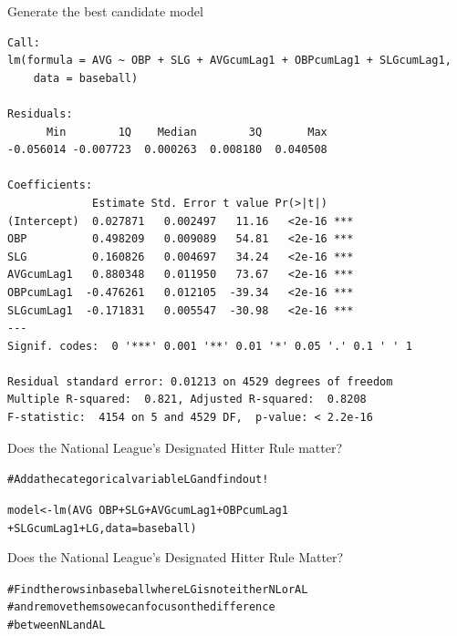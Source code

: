 \documentclass{beamer}\usepackage[]{graphicx}\usepackage[]{color}
\makeatletter
\newcommand{\hlcom}[1]{\textcolor[rgb]{0.824,0.706,0.549}{#1}}%
\newcommand{\hlopt}[1]{\textcolor[rgb]{1,0.894,0.769}{#1}}%
\newcommand{\hlstd}[1]{\textcolor[rgb]{1,0.894,0.769}{#1}}%
\newcommand{\hlkwb}[1]{\textcolor[rgb]{0.804,0.776,0.451}{#1}}%
\newcommand{\hlkwc}[1]{\textcolor[rgb]{0.78,0.941,0.545}{#1}}%
\newcommand{\hlkwd}[1]{\textcolor[rgb]{1,0.78,0.769}{#1}}%
\newenvironment{kframe}{%
 \def\at@end@of@kframe{}%
 \ifinner\ifhmode%
  \def\at@end@of@kframe{\end{minipage}}%
  \begin{minipage}{\columnwidth}%
 \fi\fi%
 \def\FrameCommand##1{\hskip\@totalleftmargin \hskip-\fboxsep
 \colorbox{shadecolor}{##1}\hskip-\fboxsep
     \hskip-\linewidth \hskip-\@totalleftmargin \hskip\columnwidth}%
 \MakeFramed {\advance\hsize-\width
   \@totalleftmargin\z@ \linewidth\hsize
   \@setminipage}}%
 {\par\unskip\endMakeFramed%
 \at@end@of@kframe}
\newenvironment{knitrout}{}{} %
\makeatother
\begin{document}
\begin{darkframes}
\begin{frame}[fragile]{Generate the best candidate model}
\begin{knitrout}
\begin{kframe}
\begin{verbatim}
Call:
lm(formula = AVG ~ OBP + SLG + AVGcumLag1 + OBPcumLag1 + SLGcumLag1, 
    data = baseball)

Residuals:
      Min        1Q    Median        3Q       Max 
-0.056014 -0.007723  0.000263  0.008180  0.040508 

Coefficients:
             Estimate Std. Error t value Pr(>|t|)    
(Intercept)  0.027871   0.002497   11.16   <2e-16 ***
OBP          0.498209   0.009089   54.81   <2e-16 ***
SLG          0.160826   0.004697   34.24   <2e-16 ***
AVGcumLag1   0.880348   0.011950   73.67   <2e-16 ***
OBPcumLag1  -0.476261   0.012105  -39.34   <2e-16 ***
SLGcumLag1  -0.171831   0.005547  -30.98   <2e-16 ***
---
Signif. codes:  0 '***' 0.001 '**' 0.01 '*' 0.05 '.' 0.1 ' ' 1

Residual standard error: 0.01213 on 4529 degrees of freedom
Multiple R-squared:  0.821,	Adjusted R-squared:  0.8208 
F-statistic:  4154 on 5 and 4529 DF,  p-value: < 2.2e-16
\end{verbatim}
\end{kframe}
\end{knitrout}

    \end{frame}


    \begin{frame}[fragile]{Does the National League's Designated Hitter Rule matter?}
    \fontsize{8}{8}\selectfont  

\begin{knitrout}
\begin{kframe}
\begin{alltt}
\hlcom{#Add a the categorical variable LG and find out!}

\hlstd{model} \hlkwb{<-} \hlkwd{lm}\hlstd{(AVG} \hlopt{~} \hlstd{OBP} \hlopt{+} \hlstd{SLG} \hlopt{+} \hlstd{AVGcumLag1} \hlopt{+} \hlstd{OBPcumLag1}
\hlopt{+} \hlstd{SLGcumLag1} \hlopt{+} \hlstd{LG,} \hlkwc{data}\hlstd{=baseball)}
\end{alltt}
\end{kframe}
\end{knitrout}

    \end{frame}


    \begin{frame}[fragile]{Does the National League's Designated Hitter Rule Matter?}
    \fontsize{8}{8}\selectfont  
    
\begin{knitrout}
\begin{kframe}
\begin{alltt}
\hlcom{# Find the rows in baseball where LG is not either NL or AL}
\hlcom{# and remove them so we can focus on the difference}
\hlcom{# between NL and AL}


\end{alltt}
\end{kframe}
\end{knitrout}
\end{frame}
\end{darkframes}
\end{document}

